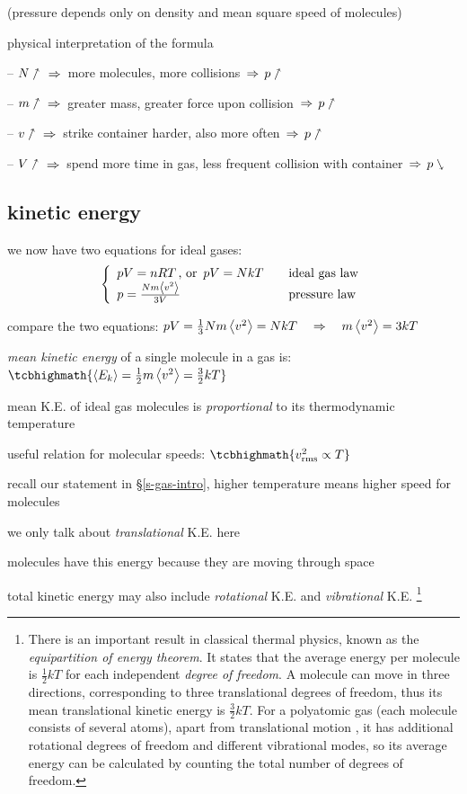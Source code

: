 (pressure depends only on density and mean square speed of molecules)

\cmt physical interpretation of the formula

\begin{compactitem}
\item[--] $N \nnearrow$ $\, \Rightarrow \,$ more molecules, more collisions $\, \Rightarrow \, p\nnearrow$

\item[--] $m \nnearrow$ $\, \Rightarrow \,$ greater mass, greater force upon collision $\, \Rightarrow \, p\nnearrow$

\item[--] $v \nnearrow$ $\, \Rightarrow \,$ strike container harder, also more often $\, \Rightarrow \, p\nnearrow$

\item[--] $V \nnearrow$ $\, \Rightarrow \,$ spend more time in gas, less frequent collision with container $\, \Rightarrow \, p\ssearrow$
\end{compactitem}


\subsection{kinetic energy}

we now have two equations for ideal gases:
\begin{equation*}
\left\{
	\begin{array}{ll}
	pV = nRT \, \text{, or } \, pV = NkT &\quad \text{ideal gas law} \\
	p = \frac{Nm\left< v^2 \right>}{3V} &\quad \text{pressure law}
	\end{array} \right.
\end{equation*}

compare the two equations: $pV=\frac{1}{3}Nm\left< v^2 \right>=NkT \quad \Rightarrow \quad m\left< v^2 \right>=3kT$

\emph{mean kinetic energy} of a single molecule in a gas is: $\tcbhighmath{\avg{E_k}=\frac{1}{2}m\avg{v^2}=\frac{3}{2}kT}$

mean K.E. of ideal gas molecules is \emph{proportional} to its thermodynamic temperature

\cmt useful relation for molecular speeds: $\tcbhighmath{v_\text{rms}^2 \propto T}$

recall our statement in \S\ref{s-gas-intro}, higher temperature means higher speed for molecules

\cmt we only talk about \emph{translational} K.E. here

molecules have this energy because they are moving through space

total kinetic energy may also include \emph{rotational} K.E. and \emph{vibrational} K.E.
\footnote{There is an important result in classical thermal physics, known as the \emph{equipartition of energy theorem}. It states that the average energy per molecule is $\frac{1}{2}kT$ for each independent \emph{degree of freedom}. A molecule can move in three directions, corresponding to three translational degrees of freedom, thus its mean translational kinetic energy is $\frac{3}{2}kT$. For a polyatomic gas (each molecule consists of several atoms), apart from translational motion , it has additional rotational degrees of freedom and different vibrational modes, so its average energy can be calculated by counting the total number of degrees of freedom.}

